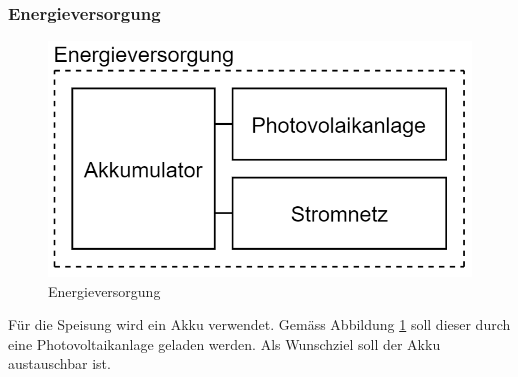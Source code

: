 \subsubsection{Energieversorgung}
\begin{figure}[h]
\centering
\includegraphics[scale=0.6]{graphics/Energieversorgung.PNG}
\caption{Energieversorgung}
\label{fig:Energieversorgung}
\end{figure}

Für die Speisung wird ein Akku verwendet. Gemäss Abbildung \ref{fig:Energieversorgung} soll dieser durch eine Photovoltaikanlage geladen werden. Als Wunschziel soll der Akku austauschbar ist.\\